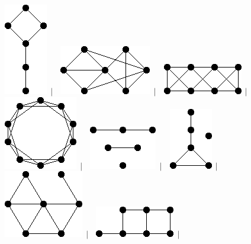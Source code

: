 \documentclass[11pt,paper=b5,footinclude,headinclude]{scrbook} %
\newtheorem{ex}{Vaja\hypertarget{sol:\theex}}[chapter]
\begin{document}
\begin{ex}
\begin{figure}
\includegraphics[scale=0.5]{smallGraphs/g_X18.png}$\,\mid\,$\
\includegraphics[scale=0.5]{smallGraphs/g_X184.png}$\,\mid\,$\
\includegraphics[scale=0.5]{smallGraphs/g_X186.png}$\,\mid\,$\
\includegraphics[scale=0.5]{smallGraphs/g_X195.png}$\,\mid\,$\
\includegraphics[scale=0.5]{smallGraphs/g_X197.png}$\,\mid\,$\
\includegraphics[scale=0.5]{smallGraphs/g_X198.png}$\,\mid\,$\
\includegraphics[scale=0.5]{smallGraphs/g_X199.png}$\,\mid\,$\
\includegraphics[scale=0.5]{smallGraphs/g_X20.png}$\,\mid\,$\

\end{figure}
\end{ex}
\end{document}
